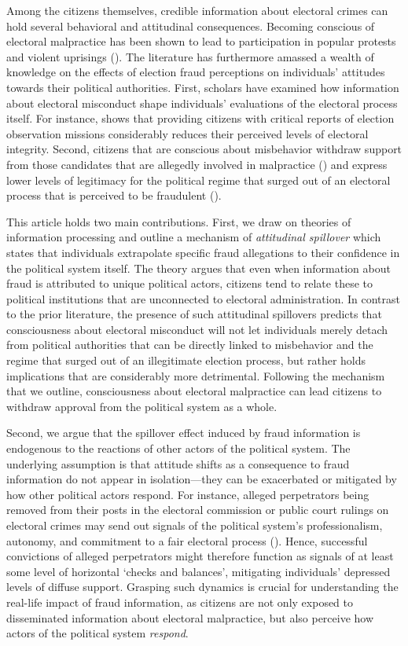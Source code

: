\documentclass[11pt, ngerman,english,a4]{article}
\begin{document}
Among the citizens themselves, credible information about electoral crimes can hold several behavioral and attitudinal consequences. Becoming conscious of electoral malpractice has been shown to lead to participation in popular protests and violent uprisings (\citealt{Daxecker2012}). The literature has furthermore amassed a wealth of knowledge on the effects of election fraud perceptions on individuals' attitudes towards their political authorities. First, scholars have examined how information about electoral misconduct shape individuals' evaluations of the electoral process itself.  For instance, \citet{Robertson2017} shows that providing citizens with critical reports of election observation missions considerably reduces their perceived levels of electoral integrity. Second, citizens that are conscious about misbehavior withdraw support from those candidates that are allegedly involved in malpractice (\citealt{Reuter2019}) and express lower levels of legitimacy for the political regime that surged out of an electoral process that is perceived to be fraudulent (\citealt{Williamson2021}).

This article holds two main contributions. First, we draw on theories of information processing and outline a mechanism of \textit{attitudinal spillover} which states that individuals extrapolate specific fraud allegations to their confidence in the political system itself. The theory argues that even when information about fraud is attributed to unique political actors, citizens tend to relate these to political institutions that are unconnected to electoral administration. In contrast to the prior literature, the presence of such attitudinal spillovers predicts that consciousness about electoral misconduct will not let individuals merely detach from political authorities that can be directly linked to misbehavior and the regime that surged out of an illegitimate election process, but rather holds implications that are considerably more detrimental. Following the mechanism that we outline, consciousness about electoral malpractice can lead citizens to withdraw approval from the political system as a whole.

Second, we argue that the spillover effect induced by fraud information is endogenous to the reactions of other actors of the political system. The underlying assumption is that attitude shifts as a consequence to fraud information do not appear in isolation---they can be exacerbated or mitigated by how other political actors respond. For instance, alleged perpetrators being removed from their posts in the electoral commission or public court rulings on electoral crimes may send out signals of the political system's professionalism, autonomy, and commitment to a fair electoral process  (\citealt{Kerr2020}). Hence, successful convictions of alleged perpetrators might therefore function as signals of at least some level of horizontal `checks and balances', mitigating individuals' depressed levels of diffuse support. Grasping such dynamics is crucial for understanding the real-life impact of fraud information, as citizens are not only exposed to disseminated information about electoral malpractice, but also perceive how actors of the political system \textit{respond}.
\end{document}
